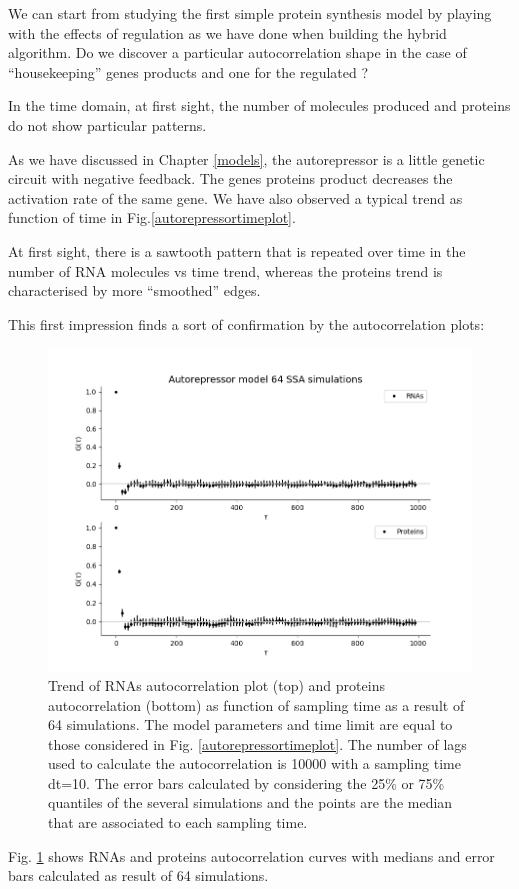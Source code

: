 \documentclass[12pt,a4paper]{report}
\begin{document}
We can start from studying the first simple protein synthesis model by playing with the effects of regulation as we have done when building the hybrid algorithm. Do we discover a particular autocorrelation shape in the case of ``housekeeping'' genes products and one for the regulated ?

In the time domain, at first sight, the number of molecules produced and proteins do not show particular patterns. 




As we have discussed in Chapter \ref{models}, the autorepressor is a little genetic circuit with negative feedback. The gene\textquotesingle s proteins product decreases the activation rate of the same gene. We have also observed a typical trend as function of time in Fig.\ref{autorepressortimeplot}.

At first sight, there is a sawtooth pattern that is repeated over time in the number of RNA molecules vs time trend, whereas the proteins trend is characterised by more ``smoothed'' edges.

This first impression finds a sort of confirmation by the autocorrelation plots:

\begin{figure}[!ht]
\centering
\includegraphics[scale=0.70]{AutorepressorModelACFnlags10000dt10nsimulations64xlim01000.PNG}
\caption{Trend of RNAs autocorrelation plot (top) and proteins autocorrelation (bottom) as function of sampling time as a result of 64 simulations. The model parameters and time limit are equal to those considered in Fig. \ref{autorepressortimeplot}. The number of lags used to calculate the autocorrelation is 10000 with a sampling time dt=10. The error bars calculated by considering the 25\% or 75\% quantiles of the several simulations and the points are the median that are associated to each sampling time.}
\label{AutorepressorModelACFnlags10000dt10nsimulations64xlim01000}
\end{figure}
\newpage
Fig. \ref{AutorepressorModelACFnlags10000dt10nsimulations64xlim01000} shows RNAs and proteins autocorrelation curves with medians and error bars calculated as result of 64 simulations. 
\end{document}
